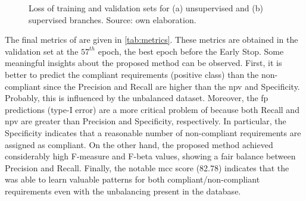 \begin{figure}[htb]
\centering
{}
\hfill
{}
\caption{Loss of training and validation sets for (a) unsupervised and (b) supervised branches. Source: own elaboration.}
\label{fig:losses}
\end{figure}
 
The final metrics of \methodname are given in \autoref{tab:metrics}. These metrics are obtained in the validation set at the $57^{th}$ epoch, the best epoch before the Early Stop. Some meaningful insights about the proposed method can be observed. First, it is better to predict the compliant requirements (positive class) than the non-compliant since the Precision and Recall are higher than the \acs{npv} and Specificity. Probably, this is influenced by the unbalanced dataset. Moreover, the \acl{fp} predictions (type-I error) are a more critical problem of \methodname because both Recall and \acs{npv} are greater than Precision and Specificity, respectively. In particular, the Specificity indicates that a reasonable number of non-compliant requirements are assigned as compliant. On the other hand, the proposed method achieved considerably high F-measure and F-beta values, showing a fair balance between Precision and Recall. Finally, the notable \acs{mcc} score (82.78) indicates that the \methodname was able to learn valuable patterns for both compliant/non-compliant requirements even with the unbalancing present in the \adhoc database.
 

